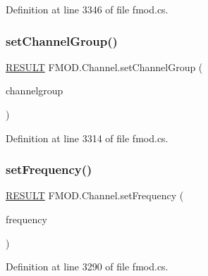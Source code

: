 Definition at line 3346 of file fmod.\+cs.

\mbox{\label{class_f_m_o_d_1_1_channel_a8b4b96034d9deed870f8c7e0ef6b363c}} 
\subsubsection{\texorpdfstring{set\+Channel\+Group()}{setChannelGroup()}}
{\footnotesize\ttfamily \hyperlink{namespace_f_m_o_d_a305d1176ef3f8c8815861a60407ac33d}{R\+E\+S\+U\+LT} F\+M\+O\+D.\+Channel.\+set\+Channel\+Group (\begin{DoxyParamCaption}\item[{\hyperlink{class_f_m_o_d_1_1_channel_group}{Channel\+Group}}]{channelgroup }\end{DoxyParamCaption})}



Definition at line 3314 of file fmod.\+cs.

\mbox{\label{class_f_m_o_d_1_1_channel_a769a955cce0dd3335d46a201878eec0a}} 
\subsubsection{\texorpdfstring{set\+Frequency()}{setFrequency()}}
{\footnotesize\ttfamily \hyperlink{namespace_f_m_o_d_a305d1176ef3f8c8815861a60407ac33d}{R\+E\+S\+U\+LT} F\+M\+O\+D.\+Channel.\+set\+Frequency (\begin{DoxyParamCaption}\item[{float}]{frequency }\end{DoxyParamCaption})}



Definition at line 3290 of file fmod.\+cs.

\mbox{\label{class_f_m_o_d_1_1_channel_a413cad870e8cee17375773a9b364290b}} 
